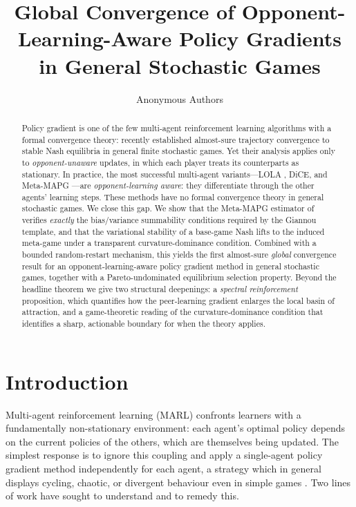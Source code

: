 \documentclass[11pt]{article}
\title{\vspace{-1.2em}\large
  Global Convergence of Opponent-Learning-Aware Policy Gradients \\
  in General Stochastic Games}
\author{Anonymous Authors}
\date{}
\theoremstyle{definition}
\theoremstyle{remark}
\begin{document}
\maketitle
\vspace{-2.2em}

\begin{abstract}
\noindent
Policy gradient is one of the few multi-agent reinforcement learning
algorithms with a formal convergence theory: \citet{giannou2022convergence}
recently established almost-sure trajectory convergence to stable Nash
equilibria in general finite stochastic games.  Yet their analysis
applies only to \emph{opponent-unaware} updates, in which each player
treats its counterparts as stationary.  In practice, the most successful
multi-agent variants---LOLA \citep{foerster2018lola}, DiCE, and
Meta-MAPG \citep{kim2021meta}---are \emph{opponent-learning aware}:
they differentiate through the other agents' learning steps.  These
methods have no formal convergence theory in general stochastic games.
We close this gap.  We show that the Meta-MAPG estimator of
\citet{kim2021meta} verifies \emph{exactly} the bias/variance
summability conditions required by the Giannou template, and that the
variational stability of a base-game Nash lifts to the induced
meta-game under a transparent curvature-dominance condition.  Combined
with a bounded random-restart mechanism, this yields the first
almost-sure \emph{global} convergence result for an
opponent-learning-aware policy gradient method in general stochastic
games, together with a Pareto-undominated equilibrium selection
property.  Beyond the headline theorem we give two structural
deepenings: a \emph{spectral reinforcement} proposition, which
quantifies how the peer-learning gradient enlarges the local basin of
attraction, and a game-theoretic reading of the
curvature-dominance condition that identifies a sharp, actionable
boundary for when the theory applies.
\end{abstract}

\section{Introduction}
\label{sec:intro}

Multi-agent reinforcement learning (MARL) confronts learners with a
fundamentally non-stationary environment: each agent's optimal policy
depends on the current policies of the others, which are themselves
being updated.  The simplest response is to ignore this coupling and
apply a single-agent policy gradient method independently for each
agent, a strategy which in general displays cycling, chaotic, or
divergent behaviour even in simple games
\citep{mazumdar2020policy,letcher2019stable}.  Two lines of work have
sought to understand and to remedy this.
\end{document}
